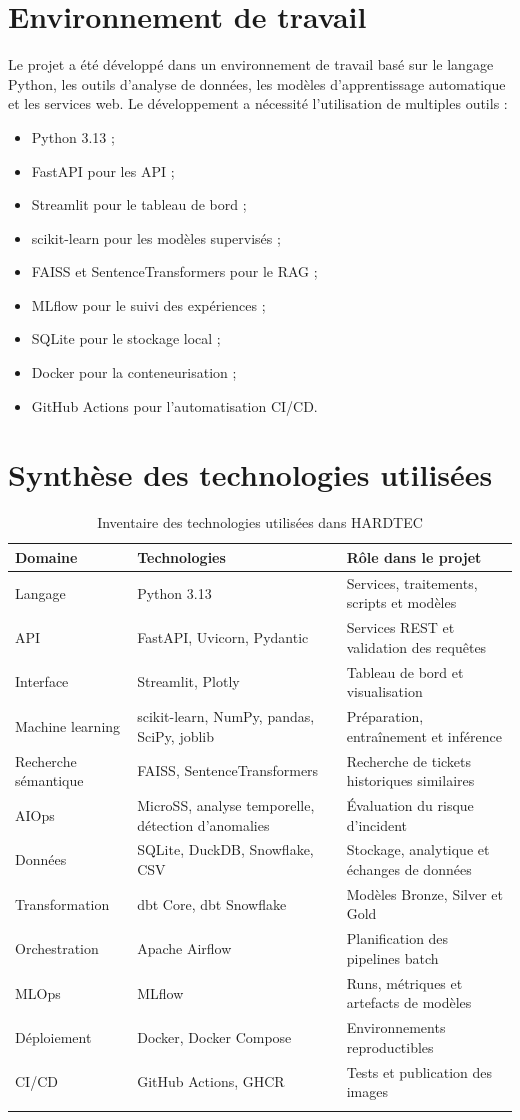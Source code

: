 \documentclass[11pt,a4paper]{report}
\begin{document}
\section{Environnement de travail}
Le projet a été développé dans un environnement de travail basé sur le langage Python, les outils d’analyse de données, les modèles d’apprentissage automatique et les services web. Le développement a nécessité l’utilisation de multiples outils :
\begin{itemize}[leftmargin=1.3em]
    \item Python 3.13 ;
    \item FastAPI pour les API ;
    \item Streamlit pour le tableau de bord ;
    \item scikit-learn pour les modèles supervisés ;
    \item FAISS et SentenceTransformers pour le RAG ;
    \item MLflow pour le suivi des expériences ;
    \item SQLite pour le stockage local ;
    \item Docker pour la conteneurisation ;
    \item GitHub Actions pour l’automatisation CI/CD.
\end{itemize}

\section{Synthèse des technologies utilisées}
\begin{longtable}{p{3.5cm}p{5.3cm}p{5.0cm}}
\toprule
\textbf{Domaine} & \textbf{Technologies} & \textbf{Rôle dans le projet} \\
\midrule
Langage & Python 3.13 & Services, traitements, scripts et modèles \\
API & FastAPI, Uvicorn, Pydantic & Services REST et validation des requêtes \\
Interface & Streamlit, Plotly & Tableau de bord et visualisation \\
Machine learning & scikit-learn, NumPy, pandas, SciPy, joblib & Préparation, entraînement et inférence \\
Recherche sémantique & FAISS, SentenceTransformers & Recherche de tickets historiques similaires \\
AIOps & MicroSS, analyse temporelle, détection d’anomalies & Évaluation du risque d’incident \\
Données & SQLite, DuckDB, Snowflake, CSV & Stockage, analytique et échanges de données \\
Transformation & dbt Core, dbt Snowflake & Modèles Bronze, Silver et Gold \\
Orchestration & Apache Airflow & Planification des pipelines batch \\
MLOps & MLflow & Runs, métriques et artefacts de modèles \\
Déploiement & Docker, Docker Compose & Environnements reproductibles \\
CI/CD & GitHub Actions, GHCR & Tests et publication des images \\
\bottomrule
\caption{Inventaire des technologies utilisées dans HARDTEC}
\end{longtable}
\end{document}
